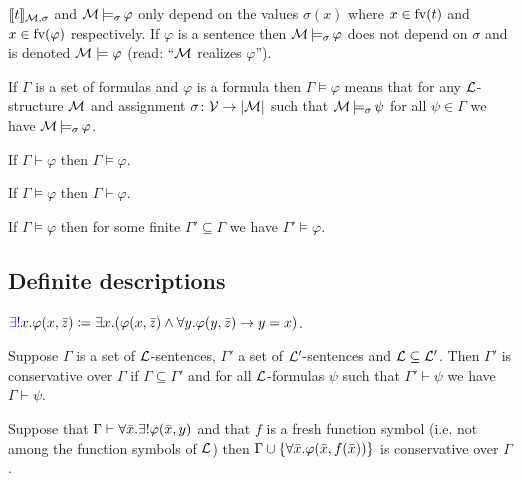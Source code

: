 \begin{rem}
    $\llbracket t \rrbracket_{\mathcal{M}, \sigma}$ and $\mathcal{M} \operatorname{\models_{\sigma}} \varphi$ only depend on the values $\sigma(x)$ where $x \in \text{fv}(t)$ and $x \in \text{fv}(\varphi)$ respectively.
    If $\varphi$ is a sentence then $\mathcal{M} \operatorname{\models_{\sigma}} \varphi$ does not depend on $\sigma$ and is denoted \alert{$\mathcal{M} \models \varphi$} (read: ``$\mathcal{M}$ realizes $\varphi$'').
\end{rem}

\begin{defi}
    If $\Gamma$ is a set of formulas and $\varphi$ is a formula then \alert{$\Gamma \models \varphi$} means that for any $\mathcal{L}$-structure $\mathcal{M}$ and assignment $\sigma \colon \mathcal{V} \to \lvert \mathcal{M} \rvert$ such that $\mathcal{M} \operatorname{\models_{\sigma}} \psi$ for all $\psi \in \Gamma$ we have $\mathcal{M} \operatorname{\models_{\sigma}} \varphi$.
\end{defi}

\begin{thm}
    If $\Gamma \vdash \varphi$ then $\Gamma \models \varphi$.
\end{thm}

\begin{thm}
    If $\Gamma \models \varphi$ then $\Gamma \vdash \varphi$.
\end{thm}

\begin{thm}
    If $\Gamma \models \varphi$ then for some finite $\Gamma' \subseteq \Gamma$ we have $\Gamma' \models \varphi$.
\end{thm}

\subsection{Definite descriptions}

\begin{defi}
    $\alert{\exists!}x. \varphi(x, \vect{z}) \coloneq \exists x. (\varphi(x, \vect{z}) \wedge \forall y. \varphi(y, \vect{z}) \to y = x)$.
\end{defi}

\begin{defi}
    Suppose $\Gamma$ is a set of $\mathcal{L}$-sentences, $\Gamma'$ a set of $\mathcal{L}'$-sentences and $\mathcal{L} \subseteq \mathcal{L}'$.
    Then \alert{$\Gamma'$ is conservative over $\Gamma$} if $\Gamma \subseteq \Gamma'$ and for all $\mathcal{L}$-formulas $\psi$ such that $\Gamma' \vdash \psi$ we have $\Gamma \vdash \psi$. 
\end{defi}

\begin{thm}
    Suppose that $\Gamma \vdash \forall \bar{x}. \exists! \varphi(\bar{x}, y)$ and that $f$ is a fresh function symbol (i.e. not among the function symbols of $\mathcal{L}$) then $\Gamma \cup \{\forall \bar{x}. \varphi(\bar{x}, f(\bar{x}))\}$ is conservative over $\Gamma$.
\end{thm}

